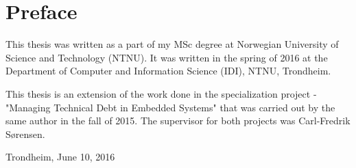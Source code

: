 \section*{\Huge Preface}
This thesis was written as a part of my MSc degree at Norwegian University of Science and Technology (NTNU). It was written in the spring of 2016 at the Department of Computer and Information Science (IDI), NTNU, Trondheim.

This thesis is an extension of the work done in the specialization project - "Managing Technical Debt in Embedded Systems" that was carried out by the same author in the fall of 2015. The supervisor for both projects was Carl-Fredrik Sørensen. \newline \newline

Trondheim, June 10, 2016

\cleardoublepage